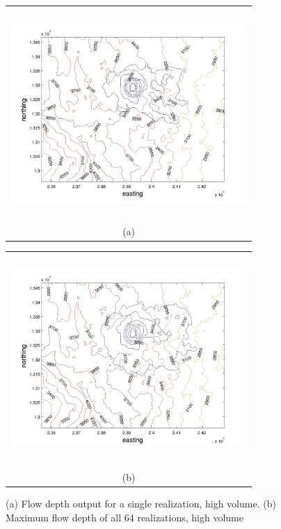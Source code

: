 \documentclass[a4paper,fleqn]{article}
\begin{document}
\begin{figure}[H]
    \begin{minipage}[b]{0.6\textwidth}
        \begin{tabular}{c}
        \includegraphics[width=9cm,height=8cm,keepaspectratio]{sample1_high_flow.jpg}\\
        (a)
        \end{tabular}
    \end{minipage}
    \begin{minipage}{0.6\textwidth}
        \begin{tabular}{c}
        \includegraphics[width=9cm,height=8cm,keepaspectratio]{all_high_flow.jpg}\\
        (b)
        \end{tabular}
    \end{minipage} 
\caption{(a) Flow depth output for a single realization, high volume. (b) Maximum flow depth of all 64 realizations, high volume }
\label{fig3}  
\end{figure}
\end{document}
